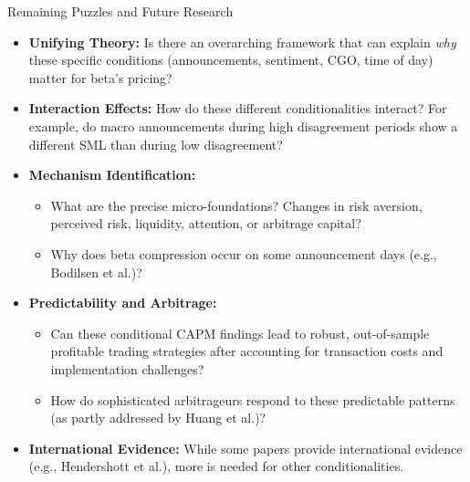 \documentclass[10pt]{beamer}
\begin{document}
\begin{frame}{Remaining Puzzles and Future Research}
  \begin{itemize}
    \item \textbf{Unifying Theory:} Is there an overarching framework that can explain \textit{why} these specific conditions (announcements, sentiment, CGO, time of day) matter for beta's pricing?
    \item \textbf{Interaction Effects:} How do these different conditionalities interact? For example, do macro announcements during high disagreement periods show a different SML than during low disagreement?
    \item \textbf{Mechanism Identification:}
    \begin{itemize}
        \item What are the precise micro-foundations? Changes in risk aversion, perceived risk, liquidity, attention, or arbitrage capital?
        \item Why does beta compression occur on some announcement days (e.g., Bodilsen et al.)?
    \end{itemize}
    \item \textbf{Predictability and Arbitrage:}
    \begin{itemize}
        \item Can these conditional CAPM findings lead to robust, out-of-sample profitable trading strategies after accounting for transaction costs and implementation challenges?
        \item How do sophisticated arbitrageurs respond to these predictable patterns (as partly addressed by Huang et al.)?
    \end{itemize}
    \item \textbf{International Evidence:} While some papers provide international evidence (e.g., Hendershott et al.), more is needed for other conditionalities.
  \end{itemize}
\end{frame}
\end{document}
